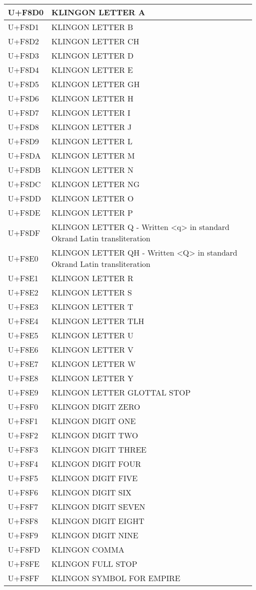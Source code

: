 \documentclass[a4paper,8pt,english]{sphinxmanual}
\begin{document}
\begin{longtable}{|l|l|}
U+F8D0
 & 
KLINGON LETTER A
\\
\hline
U+F8D1
 & 
KLINGON LETTER B
\\
\hline
U+F8D2
 & 
KLINGON LETTER CH
\\
\hline
U+F8D3
 & 
KLINGON LETTER D
\\
\hline
U+F8D4
 & 
KLINGON LETTER E
\\
\hline
U+F8D5
 & 
KLINGON LETTER GH
\\
\hline
U+F8D6
 & 
KLINGON LETTER H
\\
\hline
U+F8D7
 & 
KLINGON LETTER I
\\
\hline
U+F8D8
 & 
KLINGON LETTER J
\\
\hline
U+F8D9
 & 
KLINGON LETTER L
\\
\hline
U+F8DA
 & 
KLINGON LETTER M
\\
\hline
U+F8DB
 & 
KLINGON LETTER N
\\
\hline
U+F8DC
 & 
KLINGON LETTER NG
\\
\hline
U+F8DD
 & 
KLINGON LETTER O
\\
\hline
U+F8DE
 & 
KLINGON LETTER P
\\
\hline
U+F8DF
 & 
KLINGON LETTER Q
- Written \textless{}q\textgreater{} in standard Okrand Latin transliteration
\\
\hline
U+F8E0
 & 
KLINGON LETTER QH
- Written \textless{}Q\textgreater{} in standard Okrand Latin transliteration
\\
\hline
U+F8E1
 & 
KLINGON LETTER R
\\
\hline
U+F8E2
 & 
KLINGON LETTER S
\\
\hline
U+F8E3
 & 
KLINGON LETTER T
\\
\hline
U+F8E4
 & 
KLINGON LETTER TLH
\\
\hline
U+F8E5
 & 
KLINGON LETTER U
\\
\hline
U+F8E6
 & 
KLINGON LETTER V
\\
\hline
U+F8E7
 & 
KLINGON LETTER W
\\
\hline
U+F8E8
 & 
KLINGON LETTER Y
\\
\hline
U+F8E9
 & 
KLINGON LETTER GLOTTAL STOP
\\
\hline
U+F8F0
 & 
KLINGON DIGIT ZERO
\\
\hline
U+F8F1
 & 
KLINGON DIGIT ONE
\\
\hline
U+F8F2
 & 
KLINGON DIGIT TWO
\\
\hline
U+F8F3
 & 
KLINGON DIGIT THREE
\\
\hline
U+F8F4
 & 
KLINGON DIGIT FOUR
\\
\hline
U+F8F5
 & 
KLINGON DIGIT FIVE
\\
\hline
U+F8F6
 & 
KLINGON DIGIT SIX
\\
\hline
U+F8F7
 & 
KLINGON DIGIT SEVEN
\\
\hline
U+F8F8
 & 
KLINGON DIGIT EIGHT
\\
\hline
U+F8F9
 & 
KLINGON DIGIT NINE
\\
\hline
U+F8FD
 & 
KLINGON COMMA
\\
\hline
U+F8FE
 & 
KLINGON FULL STOP
\\
\hline
U+F8FF
 & 
KLINGON SYMBOL FOR EMPIRE
\\
\hline\end{longtable}
\end{document}
